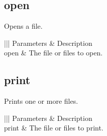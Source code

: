 \documentclass[letterpaper,12pt,english,openany,oneside]{sphinxmanual}
\begin{document}
\subsection{open}
\label{\detokenize{IAC_API_AppleEvtObjects:open}}
Opens a file.


\begin{sphinxVerbatim}[commandchars=\\\{\}]
 \PYG{p}{[}\PYG{p}{]}
\end{sphinxVerbatim}



\begin{savenotes}\sphinxattablestart
\centering
{}\label{\detokenize{IAC_API_AppleEvtObjects:section-15}}\nobreak
\begin{tabular}[t]{|||}
\hline
\sphinxstyletheadfamily 
Parameters
&\sphinxstyletheadfamily 
Description
\\
\hline
open
&
The file or files to open.
\\
\hline
\end{tabular}
\par
\sphinxattableend\end{savenotes}




\subsection{print}
\label{\detokenize{IAC_API_AppleEvtObjects:print}}
Prints one or more files.


\begin{sphinxVerbatim}[commandchars=\\\{\}]
 \PYG{p}{[}\PYG{p}{]}
\end{sphinxVerbatim}
\label{\detokenize{IAC_API_AppleEvtObjects:parameters-1}}


\begin{savenotes}\sphinxattablestart
\centering
{}\label{\detokenize{IAC_API_AppleEvtObjects:section-16}}\nobreak
\begin{tabular}[t]{|||}
\hline
\sphinxstyletheadfamily 
Parameters
&\sphinxstyletheadfamily 
Description
\\
\hline
print
&
The file or files to print.
\\
\hline
\end{tabular}
\par
\sphinxattableend\end{savenotes}
\end{document}
